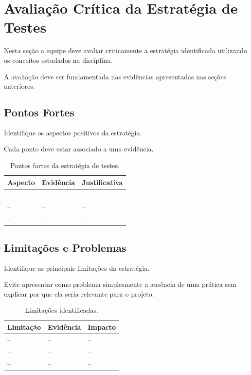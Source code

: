 \section{Avaliação Crítica da Estratégia de Testes}

Nesta seção a equipe deve avaliar criticamente a estratégia
identificada utilizando os conceitos estudados na disciplina.

A avaliação deve ser fundamentada nas evidências apresentadas
nas seções anteriores.



\subsection{Pontos Fortes}

Identifique os aspectos positivos da estratégia.

Cada ponto deve estar associado a uma evidência.

\begin{table}[H]
\centering
\caption{Pontos fortes da estratégia de testes.}
\label{tab:pontosfortes}
\begin{tabularx}{\textwidth}{l X X}
\toprule
\textbf{Aspecto} & \textbf{Evidência} & \textbf{Justificativa} \\
\midrule
-- & -- & -- \\
-- & -- & -- \\
-- & -- & -- \\
\bottomrule
\end{tabularx}
\end{table}



\subsection{Limitações e Problemas}

Identifique as principais limitações da estratégia.

Evite apresentar como problema simplesmente a ausência de uma
prática sem explicar por que ela seria relevante para o projeto.

\begin{table}[H]
\centering
\caption{Limitações identificadas.}
\label{tab:limitacoes}
\begin{tabularx}{\textwidth}{l X X}
\toprule
\textbf{Limitação} & \textbf{Evidência} & \textbf{Impacto} \\
\midrule
-- & -- & -- \\
-- & -- & -- \\
-- & -- & -- \\
\bottomrule
\end{tabularx}
\end{table}


